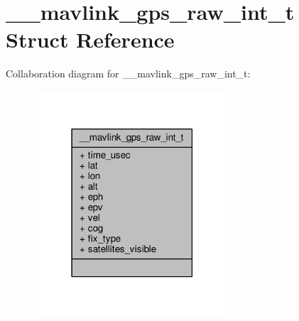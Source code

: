 \hypertarget{struct____mavlink__gps__raw__int__t}{\section{\+\_\+\+\_\+mavlink\+\_\+gps\+\_\+raw\+\_\+int\+\_\+t Struct Reference}
\label{struct____mavlink__gps__raw__int__t}
}


Collaboration diagram for \+\_\+\+\_\+mavlink\+\_\+gps\+\_\+raw\+\_\+int\+\_\+t\+:
\nopagebreak
\begin{figure}[H]
\begin{center}
\leavevmode
\includegraphics[width=207pt]{struct____mavlink__gps__raw__int__t__coll__graph}
\end{center}
\end{figure}

